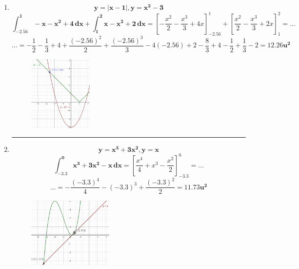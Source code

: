\documentclass[12pt]{article}
\begin{document}
\begin{itemize}
\begin{enumerate}
                \hrule
                \item \[\bm{y = \left|x - 1\right|, y = x^2 - 3}\]
                    \[\bm{\int_{-2.56}^{1} - x - x^2 + 4 \, dx + \int_{1}^{2} x - x^2 + 2 \, dx} = \left[- \frac{x^2}{2} - \frac{x^3}{3} + 4x \right]_{-2.56}^{1} + \left[\frac{x^2}{2} - \frac{x^3}{3} + 2x\right]_{1}^{2} = ...\]
                    \[... = - \frac{1}{2} - \frac{1}{3} + 4 + \frac{(-2.56)^2}{2} + \frac{(-2.56)^3}{3} - 4(-2.56) + 2 - \frac{8}{3} + 4 -\frac{1}{2} + \frac{1}{3} - 2 =  \bm{12.26u^2}\]
                    \begin{figure}[h!]
                        \centering
                        \includegraphics[width=0.3\textwidth]{img/t6-ej2-10.png}
                    \end{figure}
                
                \newpage\hrule
                \item \[\bm{y = x^3 + 3x^2, y = x}\]
                    \[\bm{\int_{-3.3}^{0}  x^3 + 3x^2 - x \, dx} = \left[\frac{x^4}{4} + x^3 - \frac{x^2}{2}\right]_{-3.3}^{0} = ...\]
                    \[... = - \frac{(-3.3)^4}{4} - (-3.3)^3 + \frac{(-3.3)^2}{2} = \bm{11.73u^2}\]
                    \begin{figure}[h!]
                        \centering
                        \includegraphics[width=0.4\textwidth]{img/t6-ej2-11.png}
                    \end{figure}
                

\end{enumerate}
\end{itemize}
\end{document}
